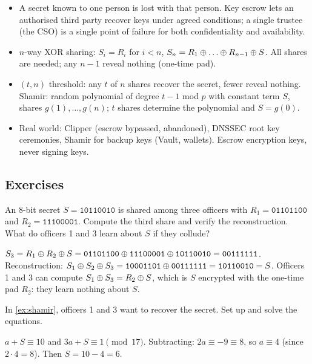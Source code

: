 \begin{summary}
\begin{itemize}
    \item A secret known to one person is lost with that person. Key escrow lets an authorised third party recover keys under agreed conditions; a single trustee (the CSO) is a single point of failure for both confidentiality and availability.
    \item $n$-way XOR sharing: $S_i = R_i$ for $i < n$, $S_n = R_1 \xor \dots \xor R_{n-1} \xor S$. All shares are needed; any $n-1$ reveal nothing (one-time pad).
    \item $(t, n)$ threshold: any $t$ of $n$ shares recover the secret, fewer reveal nothing. Shamir: random polynomial of degree $t-1$ mod $p$ with constant term $S$, shares $g(1), \dots, g(n)$; $t$ shares determine the polynomial and $S = g(0)$.
    \item Real world: Clipper (escrow bypassed, abandoned), DNSSEC root key ceremonies, Shamir for backup keys (Vault, wallets). Escrow encryption keys, never signing keys.
\end{itemize}
\end{summary}

\subsection*{Exercises}

\begin{exercise}
An 8-bit secret $S = \texttt{10110010}$ is shared among three officers with $R_1 = \texttt{01101100}$ and $R_2 = \texttt{11100001}$. Compute the third share and verify the reconstruction. What do officers 1 and 3 learn about $S$ if they collude?
\end{exercise}
\begin{solution}
$S_3 = R_1 \oplus R_2 \oplus S = \texttt{01101100} \oplus \texttt{11100001} \oplus \texttt{10110010} = \texttt{00111111}$. Reconstruction: $S_1 \oplus S_2 \oplus S_3 = \texttt{10001101} \oplus \texttt{00111111} = \texttt{10110010} = S$. Officers 1 and 3 can compute $S_1 \oplus S_3 = R_2 \oplus S$, which is $S$ encrypted with the one-time pad $R_2$: they learn nothing about $S$.
\end{solution}

\begin{exercise}
In \cref{ex:shamir}, officers 1 and 3 want to recover the secret. Set up and solve the equations.
\end{exercise}
\begin{solution}
$a + S \equiv 10$ and $3a + S \equiv 1 \pmod{17}$. Subtracting: $2a \equiv -9 \equiv 8$, so $a \equiv 4$ (since $2 \cdot 4 = 8$). Then $S = 10 - 4 = 6$.
\end{solution}

